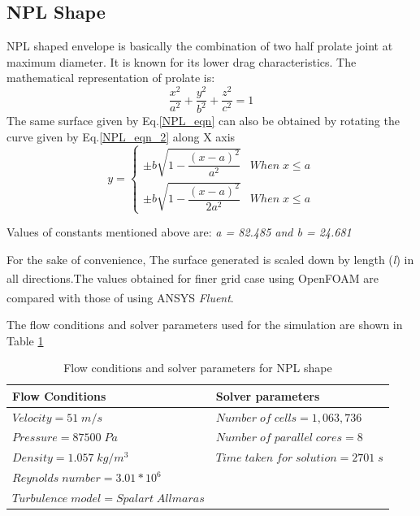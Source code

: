 \subsection{NPL Shape \cite{cheeseman2012}}
NPL shaped envelope is basically the combination of two half prolate joint at maximum diameter. It is known for its lower drag characteristics. The mathematical representation of prolate is:
\begin{equation}
\frac{x^{2}}{a^{2}} + \frac{y^{2}}{b^{2}} + \frac{z^{2}}{c^{2}} = 1
\label{NPL_eqn}
\end{equation}
The same surface given by Eq.\ref{NPL_eqn} can also be obtained by rotating the curve given by Eq.\ref{NPL_eqn_2} along X axis
\begin{equation}
y = \begin{cases}
\pm b \sqrt{1-\dfrac{(x-a)^{2}}{a^{2}}} & When \; x \le a \\
\pm b \sqrt{1-\dfrac{(x-a)^{2}}{2a^{2}}} & When \; x \le a
\end{cases}
\label{NPL_eqn_2}
\end{equation}

Values of constants mentioned above are: \textit{a = 82.485  \quad and \quad b = 24.681  }

For the sake of convenience, The surface generated is scaled down by length (\textit{l}) in all directions.The values obtained for finer grid case using OpenFOAM\textsuperscript{\textregistered} are compared with those of using ANSYS\textsuperscript{\textregistered} \textit{Fluent}. 

The flow conditions and solver parameters used for the simulation are shown in Table \ref{Flow conditions and solver parametres for NPL shape}

\begin{table}[H]
	\caption{Flow conditions and solver parameters for NPL shape}
	\label{Flow conditions and solver parametres for NPL shape}
	\centering
	\begin{tabular}{ll}
		\hline \hline
		Flow Conditions & Solver parameters  \\ \hline \hline
		
		$ Velocity = 51 \; m/s$ & $Number \; of \; cells = 1,063,736$    \\  
		$ Pressure = 87500 \; Pa $ & $ Number \; of \; parallel \; cores = 8 $     \\
		$ Density = 1.057 \; kg/m^{3} $ & $ Time \; taken \; for \; solution = 2701 \; s  $    \\
		$ Reynolds \; number = 3.01 * 10^{6} $ &    \\
		$ Turbulence \; model = Spalart \; Allmaras $ &     \\
		\hline
	\end{tabular}
\end{table}



